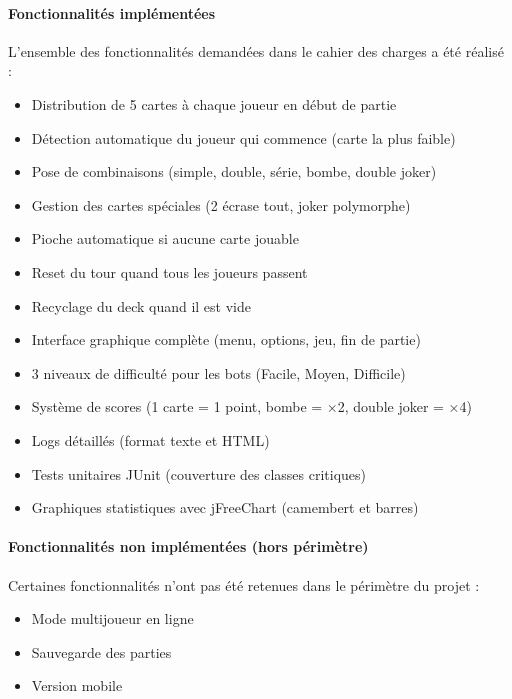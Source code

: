 \paragraph{Fonctionnalités implémentées}
L'ensemble des fonctionnalités demandées dans le cahier des charges a été réalisé :
\begin{itemize}
\item Distribution de 5 cartes à chaque joueur en début de partie
\item Détection automatique du joueur qui commence (carte la plus faible)
\item Pose de combinaisons (simple, double, série, bombe, double joker)
\item Gestion des cartes spéciales (2 écrase tout, joker polymorphe)
\item Pioche automatique si aucune carte jouable
\item Reset du tour quand tous les joueurs passent
\item Recyclage du deck quand il est vide
\item Interface graphique complète (menu, options, jeu, fin de partie)
\item 3 niveaux de difficulté pour les bots (Facile, Moyen, Difficile)
\item Système de scores (1 carte = 1 point, bombe = ×2, double joker = ×4)
\item Logs détaillés (format texte et HTML)
\item Tests unitaires JUnit (couverture des classes critiques)
\item Graphiques statistiques avec jFreeChart (camembert et barres)
\end{itemize}

\paragraph{Fonctionnalités non implémentées (hors périmètre)}
Certaines fonctionnalités n'ont pas été retenues dans le périmètre du projet :
\begin{itemize}
\item Mode multijoueur en ligne
\item Sauvegarde des parties
\item Version mobile
\end{itemize}
